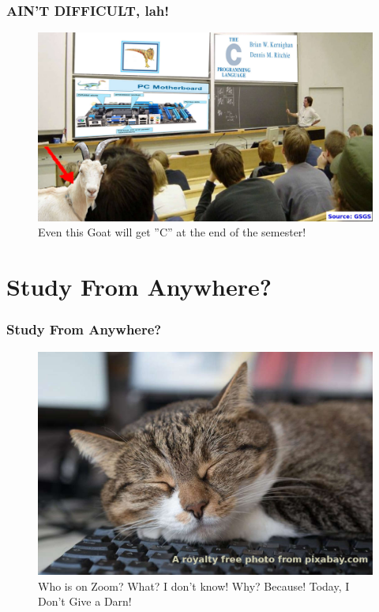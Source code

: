 \documentclass[aspectratio=169, xcolor=table, notheorems, hyperref={pdfpagelabels=false}]{beamer}
\begin{document}
\begin{frame}[fragile]
\frametitle{AIN'T DIFFICULT, lah!}
\begin{figure}
\includegraphics[width=0.79\linewidth]{os-kambing-kuliah-c}
\caption{Even this Goat will get ''C'' at the end of the semester!}
\end{figure}
\end{frame}

\section{Study From Anywhere?}
\begin{frame}[fragile]
\frametitle{Study From Anywhere?}
\begin{figure}
\includegraphics[width=0.64\linewidth]{os-cat}
\caption{Who is on Zoom? What? I don't know! Why? Because! Today, I Don't Give a Darn!}
\end{figure}
\end{frame}
\end{document}
